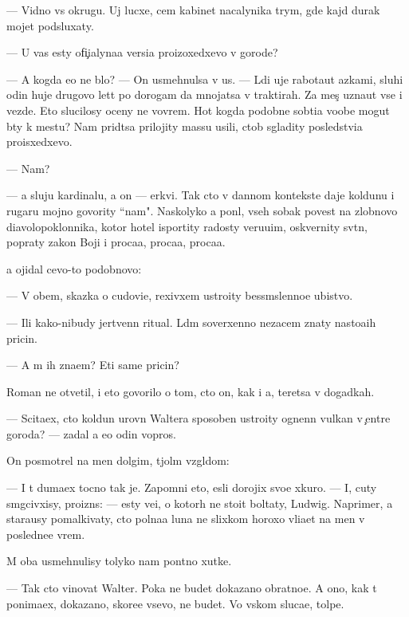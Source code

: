 \documentclass[10pt]{book}
\begin{document}
— Vidno vs{\io} okrugu. Uj lucxe, cem kabinet nacalynika t{\io}rym{\yi}, gde kajd{\yi}{\y} durak mojet podsluxaty.

— U vas {\y}esty ofi{\c}ialyna{\y}a versi{\y}a proizoxedxevo v gorode?

— A kogda {\y}e{\y}o ne b{\yi}lo? — On usmehnulsa v us{\yi}. — L{\io}di uje rabota{\y}ut {\y}a\-z{\yi}\-ka\-mi, sluhi odin huje drugovo let{\ia}t po dorogam da mnojatsa v traktirah. Za mes{\ia}{\c} uzna{\y}ut vse i vezde. Eto slucilosy oceny ne vovrem{\ia}. Hot{\ia} kogda podobn{\yi}{\y}e sob{\yi}ti{\y}a voob{\x}e mogut b{\yi}ty k mestu? Nam prid{\e}tsa prilojity massu usili{\y}, ctob{\yi} sgladity posledstvi{\y}a proisxedxevo.

— Nam?

— {\Y}a sluju kardinalu, a on — {\C}erkvi. Tak cto v dannom kontekste daje koldunu i rugaru mojno govority ``nam". Naskolyko {\y}a pon{\ia}l, vseh sobak poves{\ia}t na zlobnovo diavolopoklonnika, kotor{\yi}{\y} hotel isportity radosty veru{\y}u{\x}im, oskvernity sv{\ia}t{\yi}n{\io}, popraty zakon{\yi} Boj{\y}i i proca{\y}a, proca{\y}a, proca{\y}a.

{\Y}a ojidal cevo-to podobnovo:

— V ob{\x}em, skazka o cudovi{\x}e, rexivxem ustro{\y}ity bessm{\yi}slenno{\y}e ubi{\y}stvo.

— Ili kako{\y}-nibudy jertvenn{\yi}{\y} ritual. L{\io}d{\ia}m soverxenno nezacem znaty nasto{\y}a{\x}ih pricin.

— A m{\yi} ih zna{\y}em? Eti sam{\yi}{\y}e pricin{\yi}?

Roman ne otvetil, i eto govorilo o tom, cto on, kak i {\y}a, ter{\ia}{\y}etsa v dogadkah.

— Scita{\y}ex, cto koldun urovn{\ia} Waltera sposoben ustro{\y}ity ognen\-n{\yi}{\y} vulkan v {\c}entre go\-ro\-da? — zadal {\y}a {\y}e{\x}o odin vopros.

On posmotrel na men{\ia} dolgim, t{\ia}jol{\yi}m vzgl{\ia}dom:

— I t{\yi} duma{\y}ex tocno tak je. Zapomni eto, {\y}esli dorojix svo{\y}e{\y} xkuro{\y}. — I, cuty sm{\ia}gcivxisy, proizn{\e}s: — {\Y}esty ve{\x}i, o kotor{\yi}h ne stoit boltaty, Ludwig. Naprimer, {\y}a stara{\y}usy pomalkivaty, cto polna{\y}a luna ne slixkom horoxo vli{\y}a{\y}et na men{\ia} v posledne{\y}e vrem{\ia}.

M{\yi} oba usmehnulisy tolyko nam pon{\ia}tno{\y} xutke.

— Tak cto vinovat Walter. Poka ne budet dokazano obratno{\y}e. A ono, kak t{\yi} ponima{\y}ex, dokazano, skore{\y}e vsevo, ne budet. Vo vs{\ia}kom sluca{\y}e, tolpe.
\end{document}
